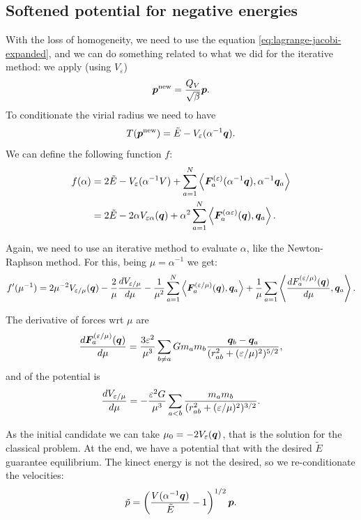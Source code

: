 \documentclass{article}
\begin{document}
\subsection{Softened potential for negative energies}
With the loss of homogeneity, we need to use the equation \eqref{eq:lagrange-jacobi-expanded}, and we can do something related to what we did for the iterative method: we apply (using $V_\varepsilon$)
\begin{equation}
    \bm p^{\text{new}} = \dfrac{Q_V}{\sqrt{\beta}} \bm p.
\end{equation}
To conditionate the virial radius we need to have
\begin{equation}
    T(\bm p^{\text{new}}) = \tilde E - V_\varepsilon(\alpha^{-1} \bm q).
\end{equation}
We can define the following function $f$:
\begin{align}
f(\alpha) 
&= 2 \tilde E - V_\varepsilon(\alpha^{-1}V) + \sum_{a=1}^N \left\langle \bm F_a^{(\varepsilon)}(\alpha^{-1} \bm q), \alpha^{-1}\bm q_a \right\rangle \nonumber \\
&= 2 \tilde E - 2 \alpha V_{\varepsilon \alpha}(\bm q) + \alpha^2 \sum_{a=1}^N \left\langle \bm F_a^{(\alpha \varepsilon)}(\bm q), \bm q_a \right\rangle.
\end{align}

Again, we need to use an iterative method to evaluate $\alpha$, like the Newton-Raphson method. For this, being $\mu = \alpha^{-1}$ we get:
\begin{equation}
f'(\mu^{-1}) = 2 \mu^{-2} V_{\varepsilon / \mu}(\bm q) - \dfrac{2}{\mu} \dfrac{d V_{\varepsilon/\mu}}{d \mu} - \dfrac{1}{\mu^2} \sum_{a=1}^N \left\langle \bm F_a^{(\varepsilon/\mu)}(\bm q), \bm q_a \right\rangle + \dfrac{1}{\mu} \sum_{a=1} \left\langle \dfrac{d F_a^{(\varepsilon/\mu)}(\bm q)}{d \mu}, \bm q_a \right\rangle.
\end{equation}

The derivative of forces wrt $\mu$ are
\begin{equation}
\dfrac{d \bm F_a^{(\varepsilon/\mu)}(\bm q)}{d \mu}
= \dfrac{3 \varepsilon^2}{\mu^3} \sum_{b \neq a} G m_a m_b \dfrac{\bm q_b - \bm q_a}{(r_{ab}^2 + (\varepsilon/\mu)^2)^{5/2}},
\end{equation}
and of the potential is
\begin{equation}
    \dfrac{d V_{\varepsilon/\mu}}{d \mu} = - \dfrac{\varepsilon^2 G}{\mu^3} \sum_{a < b} \dfrac{m_a m_b}{(r_{ab}^2 + (\varepsilon/\mu)^2)^{3/2}}.
\end{equation}

As the initial candidate we can take $\mu_0 = - 2 V_{\varepsilon}(\bm q)$, that is the solution for the classical problem. At the end, we have a potential that with the desired $\tilde E$ guarantee equilibrium. The kinect energy is not the desired, so we re-conditionate the velocities:
\begin{equation}
    \tilde p = \left(\dfrac{V(\alpha^{-1} \bm q)}{\tilde E} - 1\right)^{1/2} \bm p.
\end{equation}
\end{document}
